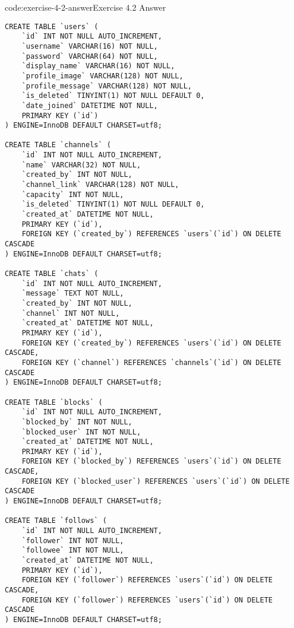 \begin{codeenv}{code:exercise-4-2-answer}{Exercise 4.2 Answer}\begin{verbatim}
CREATE TABLE `users` (
    `id` INT NOT NULL AUTO_INCREMENT,
    `username` VARCHAR(16) NOT NULL,
    `password` VARCHAR(64) NOT NULL,
    `display_name` VARCHAR(16) NOT NULL,
    `profile_image` VARCHAR(128) NOT NULL,
    `profile_message` VARCHAR(128) NOT NULL,
    `is_deleted` TINYINT(1) NOT NULL DEFAULT 0,
    `date_joined` DATETIME NOT NULL,
    PRIMARY KEY (`id`)
) ENGINE=InnoDB DEFAULT CHARSET=utf8;

CREATE TABLE `channels` (
    `id` INT NOT NULL AUTO_INCREMENT,
    `name` VARCHAR(32) NOT NULL,
    `created_by` INT NOT NULL,
    `channel_link` VARCHAR(128) NOT NULL,
    `capacity` INT NOT NULL,
    `is_deleted` TINYINT(1) NOT NULL DEFAULT 0,
    `created_at` DATETIME NOT NULL,
    PRIMARY KEY (`id`),
    FOREIGN KEY (`created_by`) REFERENCES `users`(`id`) ON DELETE CASCADE
) ENGINE=InnoDB DEFAULT CHARSET=utf8;

CREATE TABLE `chats` (
    `id` INT NOT NULL AUTO_INCREMENT,
    `message` TEXT NOT NULL,
    `created_by` INT NOT NULL,
    `channel` INT NOT NULL,
    `created_at` DATETIME NOT NULL,
    PRIMARY KEY (`id`),
    FOREIGN KEY (`created_by`) REFERENCES `users`(`id`) ON DELETE CASCADE,
    FOREIGN KEY (`channel`) REFERENCES `channels`(`id`) ON DELETE CASCADE
) ENGINE=InnoDB DEFAULT CHARSET=utf8;

CREATE TABLE `blocks` (
    `id` INT NOT NULL AUTO_INCREMENT,
    `blocked_by` INT NOT NULL,
    `blocked_user` INT NOT NULL,
    `created_at` DATETIME NOT NULL,
    PRIMARY KEY (`id`),
    FOREIGN KEY (`blocked_by`) REFERENCES `users`(`id`) ON DELETE CASCADE,
    FOREIGN KEY (`blocked_user`) REFERENCES `users`(`id`) ON DELETE CASCADE
) ENGINE=InnoDB DEFAULT CHARSET=utf8;

CREATE TABLE `follows` (
    `id` INT NOT NULL AUTO_INCREMENT,
    `follower` INT NOT NULL,
    `followee` INT NOT NULL,
    `created_at` DATETIME NOT NULL,
    PRIMARY KEY (`id`),
    FOREIGN KEY (`follower`) REFERENCES `users`(`id`) ON DELETE CASCADE,
    FOREIGN KEY (`follower`) REFERENCES `users`(`id`) ON DELETE CASCADE
) ENGINE=InnoDB DEFAULT CHARSET=utf8;
\end{verbatim}
\end{codeenv}
